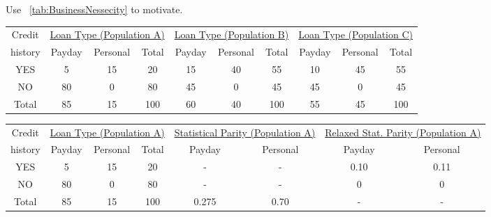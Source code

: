 Use ~\ref{tab:BusinessNessecity} to motivate.
\begin{table*}[t]
{ \small
  \center
  \renewcommand{\arraystretch}{1.5}
  \begin{tabular}{ c | c c c | c c c | c c c}
    Credit
    & \multicolumn{3}{|c|}{\underline{Loan Type (Population A)}}
    & \multicolumn{3}{|c}{\underline{Loan Type (Population B) }}
    & \multicolumn{3}{|c}{\underline{Loan Type (Population C) }} \\
    history & Payday & Personal & Total & Payday & Personal & Total & Payday & Personal & Total \\
    \hline
    YES & 5  & 15 & 20 & 15 & 40 & 55 & 10 & 45 & 55 \\
    NO  & 80 & 0  & 80 & 45 & 0 & 45 & 45 & 0 & 45\\
    \hline
    Total & 85 & 15 & 100 & 60 & 40 & 100 & 55 & 45 & 100\\
  \end{tabular}
  \label{tab:BusinessNessecity}
  \caption{{\bf Discriminatory behavior on presence of bussiness necessity (credit history).}
  At first sight users of
  population A are proportionaly taking more payday loans (payday loans come with higher interest
  than personal loans) than users of population B. Specifically, users of population A receive 25\%
  more and 20\% more  payday loans than users of populations B and C, respectively. However, upon closer
  examination, one notes that only 20\% of A's users have credit history (which is a prerequisite for personal loans)
  against 55\% of B's and C's users. Therefore, bussiness necessity requires that before examining statistical
  parity, users should be discriminated based on whether they have credit history or not.}
} \end{table*}

\begin{table*}[t]
{ \small
  \center
  \renewcommand{\arraystretch}{1.5}
  \begin{tabular}{ c | c c c | c c | c c}
    Credit
    & \multicolumn{3}{|c|}{\underline{Loan Type (Population A)}}
    & \multicolumn{2}{|c}{\underline{Statistical Parity (Population A) }}
    & \multicolumn{2}{|c}{\underline{Relaxed Stat. Parity (Population A) }} \\
    history & Payday & Personal & Total & Payday & Personal & Payday & Personal \\
    \hline
    YES & 5  & 15 & 20 & - & - &  0.10 & 0.11 \\
    NO  & 80 & 0  & 80 & - & - &  0    & 0 \\
    \hline
    Total & 85 & 15 & 100 & 0.275 & 0.70 & - & - \\
  \end{tabular}
  \label{tab:BusinessNessecityA}
  \caption{{\bf Relaxing statistical parity on presence of bussiness necessity (credit history).}
  Without considering business necessity (credit history) the condition for statistical parity
  yields a higher delta than if we consider business necessity and let the users be discriminated
  on whether they have credit history or not.}
} \end{table*}


